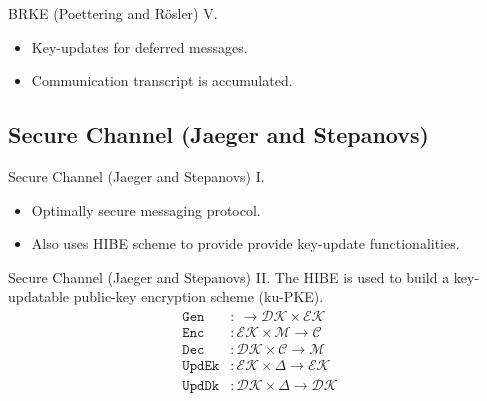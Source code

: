 \documentclass{beamer}
\begin{document}
\begin{frame}{BRKE (Poettering and Rösler) V.}
  \scriptsize
    \begin{figure}[h]
        \centering
        \setlength{\fboxsep}{10pt}
        \scalebox{0.6}{%
        \fbox{%
          
        }
      }
   \end{figure}
       \begin{itemize}
       \item Key-updates for deferred messages.
       \item Communication transcript is accumulated.
       \end{itemize}
\end{frame}

\subsection{Secure Channel (Jaeger and Stepanovs)}
\label{sec:secure-chann-jaeg}

\begin{frame}{Secure Channel (Jaeger and Stepanovs) I.}
  \begin{itemize}
  \item Optimally secure messaging protocol.
  \item Also uses HIBE scheme to provide provide key-update
    functionalities.
  \end{itemize}
\end{frame}

\begin{frame}{Secure Channel (Jaeger and Stepanovs) II.}
  The HIBE is used to build a key-updatable public-key encryption scheme (ku-PKE).
  \begin{align*}
    \texttt{Gen} & : \ \rightarrow \mathcal{DK} \times \mathcal{EK} \\
    \texttt{Enc} & : \mathcal{EK} \times \mathcal{M} \rightarrow \mathcal{C} \\
    \texttt{Dec} & : \mathcal{DK} \times \mathcal{C} \rightarrow \mathcal{M} \\
    \texttt{UpdEk} & : \mathcal{EK} \times \Delta \rightarrow \mathcal{EK} \\
    \texttt{UpdDk} & : \mathcal{DK} \times \Delta \rightarrow \mathcal{DK}
  \end{align*}
\end{frame}
\end{document}

